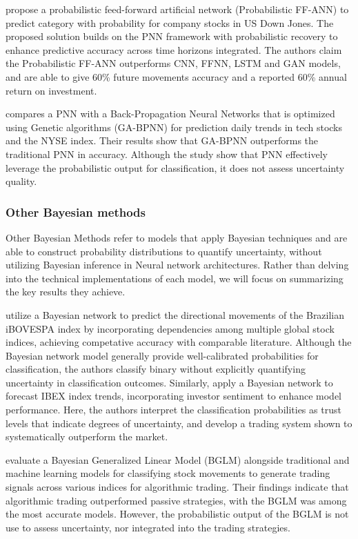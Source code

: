 \textcite{Maniatopoulos2022pnn} propose a probabilistic feed-forward artificial network (Probabilistic FF-ANN) to predict category with probability for company stocks in US Down Jones. The proposed solution builds on the PNN framework with probabilistic recovery to enhance predictive accuracy across time horizons integrated. The authors claim the Probabilistic FF-ANN outperforms CNN, FFNN, LSTM and GAN models, and are able to give 60\% future movements accuracy and a reported 60\% annual return on investment. 

\textcite{Lahmiri2024pnn} compares a PNN with a Back-Propagation Neural Networks that is optimized using 
Genetic algorithms (GA-BPNN) for prediction daily trends in tech stocks and the NYSE index. Their results show that GA-BPNN outperforms the traditional PNN in accuracy. Although the study show that PNN effectively leverage the probabilistic output for classification, it does not assess uncertainty quality.  


\subsubsection{Other Bayesian methods}
Other Bayesian Methods refer to models that apply Bayesian techniques and are able to construct probability distributions to quantify uncertainty, without utilizing Bayesian inference in Neural network architectures. Rather than delving into the technical implementations of each model, we will focus on summarizing the key results they achieve. 

\textcite{Malagrino2018Forecasting} utilize a Bayesian network to predict the directional movements of the Brazilian iBOVESPA index by incorporating dependencies among multiple global stock indices, achieving competative accuracy with comparable literature. Although the Bayesian network model generally provide well-calibrated probabilities for classification, the authors classify binary without explicitly quantifying uncertainty in classification outcomes. Similarly, \textcite{Raúl_PlazaCasado_PradoRomán_2021} apply a Bayesian network to forecast IBEX index trends, incorporating investor sentiment to enhance model performance. Here, the authors interpret the classification probabilities as trust levels that indicate degrees of uncertainty, and develop a trading system shown to systematically outperform the market.

\textcite{Grudniewicz2023Application} evaluate a Bayesian Generalized Linear Model (BGLM) alongside traditional and machine learning models for classifying stock movements to generate trading signals across various indices for algorithmic trading. Their findings indicate that algorithmic trading outperformed passive strategies, with the BGLM was among the most accurate models. However, the probabilistic output of the BGLM is not use to assess uncertainty, nor integrated into the trading strategies. 

